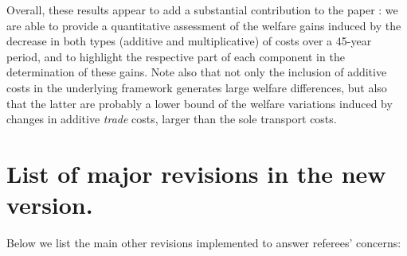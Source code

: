 \documentclass[12pt]{article}
\begin{document}
Overall, these results appear to add a substantial contribution to the paper : we are able to provide a quantitative assessment of the welfare gains induced by the decrease in both types (additive and multiplicative) of costs over a 45-year period, and to highlight the respective part of each component in the determination of these gains. Note also that not only the inclusion of additive costs in the underlying framework generates large welfare differences, but also that the latter are probably a lower bound of the welfare variations induced by changes in additive \emph{trade} costs, larger than the sole transport costs.
   

\section{List of major revisions in the new version.}

Below we list the main other revisions implemented to answer referees' concerns:
\end{document}
